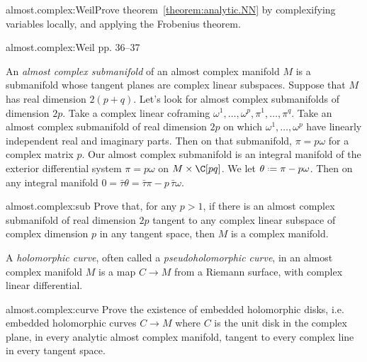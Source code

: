 \begin{problem*}{almost.complex:Weil}Prove theorem~\vref{theorem:analytic.NN} by complexifying variables locally, and applying the Frobenius theorem.\end{problem*}
\begin{answer}{almost.complex:Weil}
\cite{Weil:1958} pp. 36--37
\end{answer}
%
An \emph{almost complex submanifold} of an almost complex manifold \(M\) is a submanifold whose tangent planes are complex linear subspaces.
Suppose that \(M\) has real dimension \(2(p+q)\).
Let's look for almost complex submanifolds of dimension \(2p\).
Take a complex linear coframing \(\omega^1,\dots,\omega^p,\pi^1,\dots,\pi^q\).
Take an almost complex submanifold of real dimension \(2p\) on which \(\omega^1,\dots,\omega^p\) have linearly independent real and imaginary parts.
Then on that submanifold, \(\pi=p\omega\) for a complex matrix \(p\).
Our almost complex submanifold is an integral manifold of the exterior differential system \(\pi=p\omega\) on \(M\times\C[pq]\).
We let \(\theta\defeq\pi-p\omega\).
Then on any integral manifold \(0=\bar\tau\theta=\bar\tau\pi-p \, \bar\tau\omega\).
\begin{problem}{almost.complex:sub}
Prove that, for any \(p>1\), if there is an almost complex submanifold of real dimension \(2p\) tangent to any complex linear subspace of complex dimension \(p\) in any tangent space, then \(M\) is a complex manifold.
\end{problem}
A \emph{holomorphic curve}, often called a \emph{pseudoholomorphic curve}, in an almost complex manifold \(M\) is a map \(C \to M\) from a Riemann surface, with complex linear differential.
\begin{problem}{almost.complex:curve}
Prove the existence of embedded holomorphic disks, i.e. embedded holomorphic curves \(C \to M\) where \(C\) is the unit disk in the complex plane, in every analytic almost complex manifold, tangent to every complex line in every tangent space.
\end{problem}